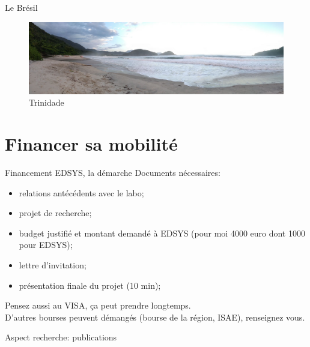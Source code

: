 \documentclass{beamer}
\begin{document}
\begin{frame}{Le Brésil}
{\begin{figure}
\end{figure}
\begin{figure}
	\centering
	\includegraphics[width=.9\linewidth]{trinidade_plage.jpg}\caption{Trinidade}
\end{figure}
}

\end{frame}

\section{Financer sa mobilité}
\begin{frame}{Financement EDSYS, la démarche}
Documents nécessaires:
\begin{itemize}
	\item relations antécédents avec le labo;
	\item projet de recherche;
	\item budget justifié et montant demandé à EDSYS (pour moi 4000 euro dont 1000 pour EDSYS);
	\item lettre d'invitation;
	\item présentation finale du projet (10 min);
\end{itemize}
Pensez aussi au VISA, ça peut prendre longtemps. \\
D'autres bourses peuvent démangés (bourse de la région, ISAE), renseignez vous.
\end{frame}

\begin{frame}{Aspect recherche: publications}

\nocite{*}

\end{frame}
\end{document}
